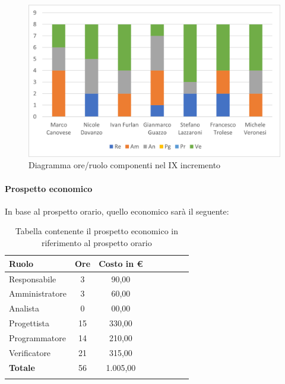 \begin{figure}[H]
	\centering
	\includegraphics[width=0.8\linewidth]{res/images/preventivo/dettaglio_analisi/2-1.png}
	\caption{Diagramma ore/ruolo componenti nel IX incremento}
	\label{fig:diagramma suddivisione ruoli IX incremento}
\end{figure}

\paragraph{Prospetto economico}
In base al prospetto orario, quello economico sarà il seguente:

\begin{longtable}{|l|c|c|c|c|c|c|c|}
	\hline
	\rowcolor{lighter-grayer}
	\textbf{Ruolo}  & \textbf{Ore} & \textbf{Costo in €} \\
	\hline
	\endfirsthead

	\hline
	Responsabile    & 3            & 90,00              \\
	\hline
	\hline
	Amministratore  & 3           & 60,00              \\
	\hline
	\hline
	Analista        & 0           & 00,00              \\
	\hline
	\hline
	Progettista     & 15            & 330,00                   \\
	\hline
	\hline
	Programmatore   & 14            & 210,00                   \\
	\hline
	\hline
	Verificatore    & 21           & 315,00              \\
	\hline
	\hline
	\textbf{Totale} & 56           & 1.005,00            \\
	\hline
	\rowcolor{white}
	\caption{Tabella contenente il prospetto economico in riferimento al prospetto orario}
\end{longtable}
\pagebreak

